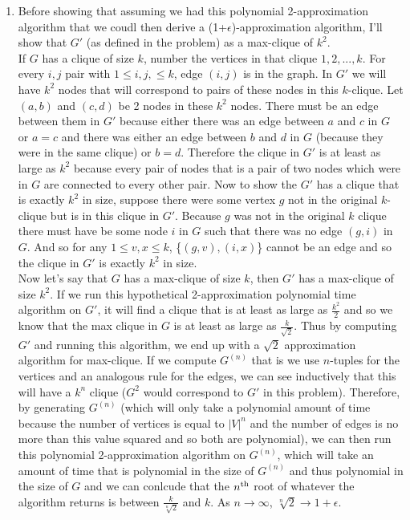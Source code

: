 \documentclass{article}
\begin{document}
\begin{enumerate}
	\item Before showing that assuming we had this polynomial 2-approximation algorithm that we coudl then derive a (1+$\epsilon$)-approximation algorithm, I'll show that $G'$ (as defined in the problem) as a max-clique of $k^2$.
	\\
	If $G$ has a clique of size $k$, number the vertices in that clique $1,2,...,k$.  For every $i,j$ pair with $1\leq i,j, \leq k$, edge $(i,j)$ is in the graph.  In $G'$ we will have $k^2$ nodes that will correspond to pairs of these nodes in this $k$-clique.  Let $(a,b)$ and $(c,d)$ be 2 nodes in these $k^2$ nodes.  There must be an edge between them in $G' $ because either there was an edge between $a$ and $c$ in $G$ or $a = c$ and there was either an edge between $b$ and $d$ in $G$ (because they were in the same clique) or $b=d$.  Therefore the clique in $G'$ is at least as large as $k^2$ because every pair of nodes that is a pair of two nodes which were in $G$ are connected to every other pair.  Now to show the $G'$ has a clique that is exactly $k^2$ in size, suppose there were some vertex $g$ not in the original $k$-clique but is in this clique in $G'$.  Because $g$ was not in the original $k$ clique there must have be some node $i$ in $G$ such that there was no edge $(g,i)$ in $G$.  And so for any $1\leq v,x \leq k$, \{$(g,v), (i,x)$\} cannot be an edge and so the clique in $G'$ is exactly $k^2$ in size.
	\\
	Now let's say that $G$ has a max-clique of size $k$, then $G'$ has a max-clique of size $k^2$.  If we run this hypothetical 2-approximation polynomial time algorithm on $G'$, it will find a clique that is at least as large as $\frac{k^2}{2}$ and so we know that the max clique in $G$ is at least as large as $\frac{k}{\sqrt{2}}$.  Thus by computing $G'$ and running this algorithm, we end up with a $\sqrt{2}$ approximation algorithm for max-clique.  If we compute $G^{(n)}$ that is we use $n$-tuples for the vertices and an analogous rule for the edges, we can see inductively that this will have a $k^n$ clique ($G^2$ would correspond to $G'$ in this problem).  Therefore, by  generating $G^{(n)}$ (which will only take a polynomial amount of time because the number of vertices is equal to $|V|^n$ and the number of edges is no more than this value squared and so both are polynomial), we can then run this polynomial 2-approximation algorithm on $G^{(n)}$, which will take an amount of time that is polynomial in the size of $G^{(n)}$ and thus polynomial in the size of $G$  and we can conlcude that the $n^{\textup{th}}$ root of whatever the algorithm returns is between $\frac{k}{\sqrt[n]{2}}$ and $k$.  As $n\to\infty$, $\sqrt[n]{2}\to 1+\epsilon$.  
	

\end{enumerate}
\end{document}

